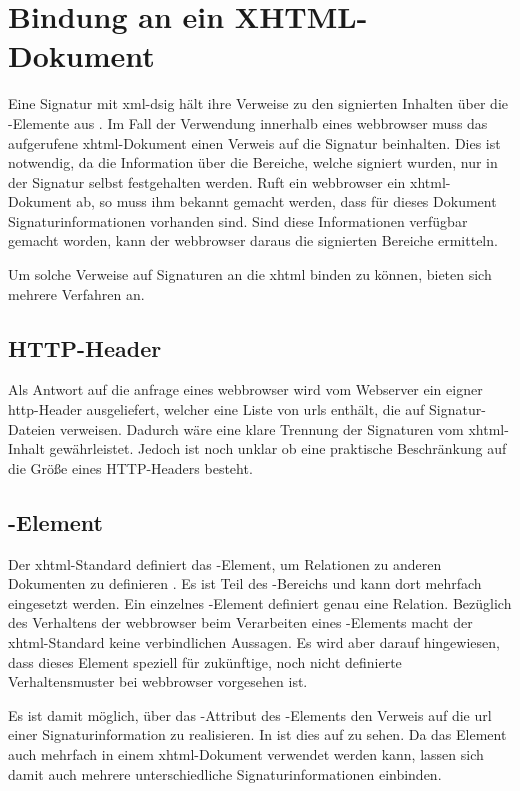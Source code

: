 \chapter{Bindung an ein XHTML-Dokument}
\label{sec:Signaturbindung:XHTML}
Eine Signatur mit \gls{xml-dsig} hält ihre Verweise zu den signierten Inhalten über die -Elemente aus .
Im Fall der Verwendung innerhalb eines \gls{webbrowser} muss das aufgerufene \gls{xhtml}-Dokument einen Verweis auf die Signatur beinhalten. Dies ist notwendig,
da die Information über die Bereiche, welche signiert wurden, nur in der Signatur selbst festgehalten werden. Ruft ein \gls{webbrowser} ein \gls{xhtml}-Dokument
ab, so muss ihm bekannt gemacht werden, dass für dieses Dokument Signaturinformationen vorhanden sind. Sind diese Informationen verfügbar gemacht worden, kann
der \gls{webbrowser} daraus die signierten Bereiche ermitteln.

Um solche Verweise auf Signaturen an die \gls{xhtml} binden zu können, bieten sich mehrere Verfahren an.

\section{HTTP-Header}
Als Antwort auf die anfrage eines \gls{webbrowser} wird vom Webserver ein eigner \gls{http}-Header ausgeliefert, welcher eine Liste von \glspl{url} enthält, die auf
Signatur-Dateien verweisen. Dadurch wäre eine klare Trennung der Signaturen vom \gls{xhtml}-Inhalt gewährleistet.
Jedoch ist noch unklar ob eine praktische Beschränkung auf die Größe eines HTTP-Headers besteht.\todo

\section{-Element}
Der \gls{xhtml}-Standard definiert das -Element, um Relationen zu anderen Dokumenten zu definieren \cite{xhtml:oreilly}. Es ist Teil des
-Bereichs und kann dort mehrfach eingesetzt werden. Ein einzelnes -Element definiert genau eine Relation. Bezüglich des Verhaltens
der \gls{webbrowser} beim Verarbeiten eines -Elements macht der \gls{xhtml}-Standard keine verbindlichen Aussagen. Es wird aber darauf
hingewiesen, dass dieses Element speziell für zukünftige, noch nicht definierte Verhaltensmuster bei \gls{webbrowser} vorgesehen ist.

Es ist damit möglich, über das -Attribut des -Elements den Verweis auf die \gls{url} einer Signaturinformation zu realisieren. In
 ist dies auf  zu sehen. Da das
Element auch mehrfach in einem \gls{xhtml}-Dokument verwendet werden kann, lassen sich damit auch mehrere unterschiedliche Signaturinformationen einbinden.

